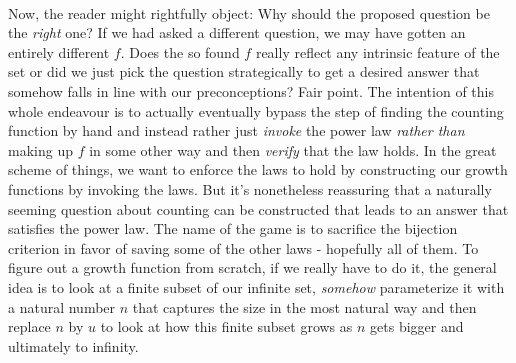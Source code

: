 \documentclass[12pt]{article}
\begin{document}
\paragraph{} 
Now, the reader might rightfully object: Why should the proposed question be the \emph{right} one? If we had asked a different question, we may have gotten an entirely different $f$. Does the so found $f$ really reflect any intrinsic feature of the set or did we just pick the question strategically to get a desired answer that somehow falls in line with our preconceptions? Fair point. The intention of this whole endeavour is to actually eventually bypass the step of finding the counting function by hand and instead rather just \emph{invoke} the power law \emph{rather than} making up $f$ in some other way and then \emph{verify} that the law holds. In the great scheme of things, we want to enforce the laws to hold by constructing our growth functions by invoking the laws. But it's nonetheless reassuring that a naturally seeming question about counting can be constructed that leads to an answer that satisfies the power law. The name of the game is to sacrifice the bijection criterion in favor of saving some of the other laws - hopefully all of them. To figure out a growth function from scratch, if we really have to do it, the general idea is to look at a finite subset of our infinite set, \emph{somehow} parameterize it with a natural number $n$ that captures the size in the most natural way and then replace $n$ by $u$ to look at how this finite subset grows as $n$ gets bigger and ultimately to infinity.

\end{document}
